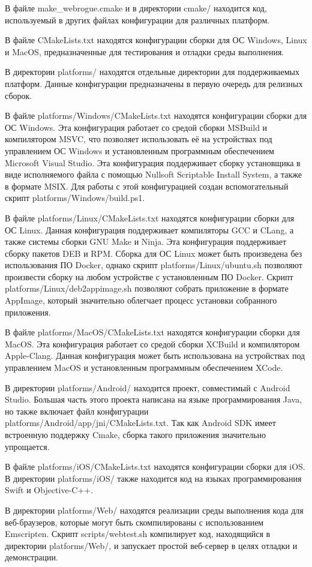 В файле make\_webrogue.cmake и в директории cmake/ находится код, используемый в других файлах конфигурации для различных платформ.

В файле CMakeLists.txt находятся конфигурации сборки для ОС Windows, Linux и MacOS, предназначенные для тестирования и отладки среды выполнения.

В директории platforms/ находятся отдельные директории для поддерживаемых платформ. Данные конфигурации предназначены в первую очередь для релизных сборок.

В файле platforms/Windows/CMakeLists.txt находятся конфигурации сборки для ОС Windows. 
Эта конфигурация работает со средой сборки MSBuild и компилятором MSVC, что позволяет использовать её на устройствах под управлением ОС Windows и установленным программным обеспечением Microsoft Visual Studio.
Эта конфигурация поддерживает сборку установщика в виде исполняемого файла с помощью Nullsoft Scriptable Install System, а также в формате MSIX.
Для работы с этой конфигурацией создан вспомогательный скрипт platforms/Windows/build.ps1.

В файле platforms/Linux/CMakeLists.txt находятся конфигурации сборки для ОС Linux. 
Данная конфигурация поддерживает компиляторы GCC и CLang, а также системы сборки GNU Make и Ninja.
Эта конфигурация поддерживает сборку пакетов DEB и RPM.
Сборка для ОС Linux может быть произведена без использования ПО Docker, однако скрипт platforms/Linux/ubuntu.sh позволяют произвести сборку на любом устройстве с установленным ПО Docker.
Скрипт platforms/Linux/deb2appimage.sh позволяют собрать приложение в формате AppImage, который значительно облегчает процесс установки собранного приложения.

В файле platforms/MacOS/CMakeLists.txt находятся конфигурации сборки для MacOS. 
Эта конфигурация работает со средой сборки XCBuild и компилятором Apple-Clang.
Данная конфигурация может быть использована на устройствах под управлением MacOS и установленным программным обеспечением XCode.

В директории platforms/Android/ находится проект, совместимый с Android Studio.
Большая часть этого проекта написана на языке программирования Java, но также включает файл конфигурации platforms/Android/app/jni/CMakeLists.txt.
Так как Android SDK имеет встроенную поддержку Cmake, сборка такого приложения значительно упрощается.

В файле platforms/iOS/CMakeLists.txt находятся конфигурации сборки для iOS. 
В директории platforms/iOS/ также находится код на языках программирования Swift и Objective-C++.

В директории platforms/Web/ находятся реализации среды выполнения кода для веб-браузеров, которые могут быть скомпилированы с использованием Emscripten.
Скрипт scripts/webtest.sh компилирует код, находящийся в директории platforms/Web/, и запускает простой веб-сервер в целях отладки и демонстрации.
